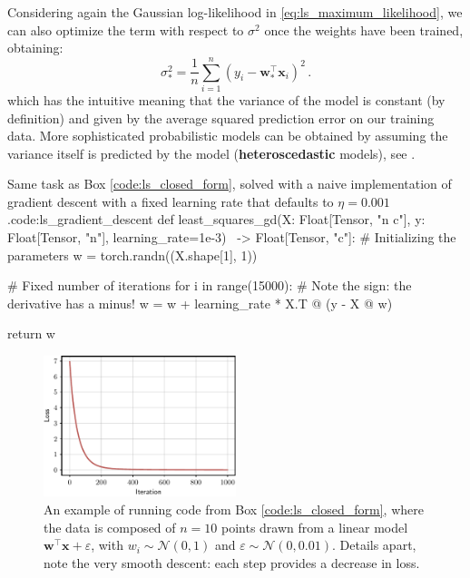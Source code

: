 Considering again the Gaussian log-likelihood in \eqref{eq:ls_maximum_likelihood}, we can also optimize the term with respect to $\sigma^2$ once the weights have been trained, obtaining:
%
\begin{equation}
\sigma_*^{2} = \frac{1}{n}\sum_{i=1}^n (y_i - \mathbf{w}_*^{\top}\mathbf{x}_i)^2 \,.
\label{eq:ls_sigma}
\end{equation}
%
which has the intuitive meaning that the variance of the model is constant (by definition) and given by the average squared prediction error on our training data. More sophisticated probabilistic models can be obtained by assuming the variance itself is predicted by the model (\textbf{heteroscedastic} models), see \cite{bishop2006pattern}.

\begin{mypy}{Same task as Box \protect\ref{code:ls_closed_form}, solved with a naive implementation of gradient descent with a fixed learning rate that defaults to $\eta = 0.001$.}{code:ls_gradient_descent}
def least_squares_gd(X: Float[Tensor, "n c"],
                     y: Float[Tensor, "n"],
                     learning_rate=1e-3) \
                     -> Float[Tensor, "c"]:
    # Initializing the parameters
    w = torch.randn((X.shape[1], 1))

    # Fixed number of iterations
    for i in range(15000):
      # Note the sign: the derivative has a minus!
      w = w + learning_rate * X.T @ (y - X @ w)

    return w
\end{mypy}

\begin{figure}
    \centering
    \hspace{1em} \includegraphics[width=0.5\textwidth]{images/least_squares_example.pdf}
    \caption{An example of running code from Box \ref{code:ls_closed_form}, where the data is composed of $n=10$ points drawn from a linear model $\mathbf{w}^\top \mathbf{x} + \varepsilon$, with $w_i \sim \mathcal{N}(0, 1)$ and $\varepsilon \sim \mathcal{N}(0, 0.01)$. Details apart, note the very smooth descent: each step provides a decrease in loss.}
    \label{fig:loss_evolution}
\end{figure}


